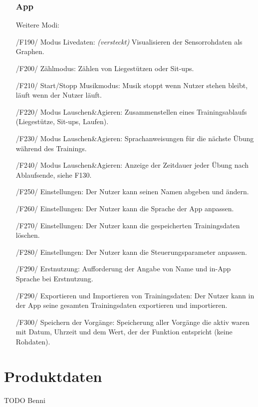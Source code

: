 \documentclass[a4paper,12pt]{article}
\begin{document}
\begin{itemize}
    \subsubsection{App}
      Weitere Modi:
      \item[/F190/] \textsf{Modus Livedaten: \textit{(versteckt)}} Visualisieren der Sensorrohdaten als Graphen.    
      \item[/F200/] \textsf{Zählmodus:} Zählen von Liegestützen oder Sit-ups. %
      \item[/F210/] \textsf{Start/Stopp Musikmodus:} Musik stoppt wenn Nutzer stehen bleibt, läuft wenn der Nutzer läuft.
      \item[/F220/] \textsf{Modus Lauschen\&Agieren:} Zusammenstellen eines Trainingsablaufs (Liegestütze, Sit-ups, Laufen). 
      \item[/F230/] \textsf {Modus Lauschen\&Agieren:} Sprachanweisungen für die nächste Übung während des Trainings.
      \item[/F240/] \textsf {Modus Lauschen\&Agieren:} Anzeige der Zeitdauer jeder Übung nach Ablaufsende, siehe F130.
      \item[/F250/] \textsf {Einstellungen:} Der Nutzer kann seinen Namen abgeben und ändern.
      \item[/F260/] \textsf {Einstellungen:} Der Nutzer kann die Sprache der App anpassen.
      \item[/F270/] \textsf {Einstellungen:} Der Nutzer kann die gespeicherten Trainingsdaten löschen.
      \item[/F280/] \textsf {Einstellungen:} Der Nutzer kann die Steuerungsparameter anpassen. %
      \item[/F290/] \textsf {Erstnutzung:} Aufforderung der Angabe von Name und in-App Sprache bei Erstnutzung.
      \item[/F290/] \textsf{Exportieren und Importieren von Trainingsdaten:} Der Nutzer kann in der App seine gesamten Trainingsdaten exportieren und importieren.
      \item[/F300/] \textsf{Speichern der Vorgänge:} Speicherung aller Vorgänge die aktiv waren mit Datum, Uhrzeit und dem Wert, der der Funktion entspricht (keine Rohdaten).   %
    \end{itemize}


\section{Produktdaten}
TODO Benni
\end{document}
